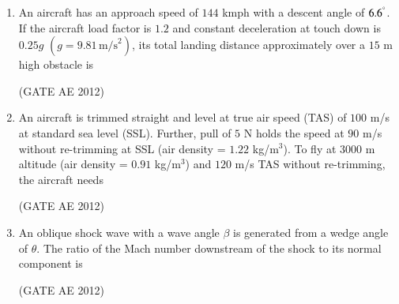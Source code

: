 \documentclass[journal,12pt,onecolumn]{IEEEtran}
\theoremstyle{remark}
\begin{document}
\begin{enumerate}
\item An aircraft has an approach speed of $144$ kmph with a descent angle of $6.6^\degree$. If the aircraft load factor is $1.2$ and constant deceleration at touch down is $0.25g$ $(g = 9.81 \, \text{m/s}^2)$, its total landing distance approximately over a $15$ m high obstacle is
\begin{enumerate}
\end{enumerate}
\hfill(GATE AE 2012)



\item An aircraft is trimmed straight and level at true air speed (TAS) of $100$ m/s at standard sea level (SSL). Further, pull of $5$ N holds the speed at $90$ m/s without re-trimming at SSL (air density = $1.22$ kg/m$^3$). To fly at $3000$ m altitude (air density = $0.91$ kg/m$^3$) and $120$ m/s TAS without re-trimming, the aircraft needs
\begin{enumerate}
\end{enumerate}
\hfill(GATE AE 2012)



\item An oblique shock wave with a wave angle $\beta$ is generated from a wedge angle of $\theta$. The ratio of the Mach number downstream of the shock to its normal component is
\begin{enumerate}
\end{enumerate}
\hfill(GATE AE 2012)




\end{enumerate}
\end{document}
